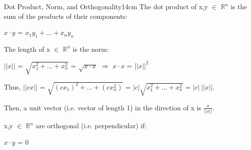     \begin{definition}{Dot Product, Norm, and Orthogonality}{14cm}
        The {\color{lblue} dot product} of x,y $\in$ $\mathbb{R}^n$
        is the sum of the products of their components:
        
        \hspace{0.5cm}
        $x \cdot y$ = $x_1y_1 + ... + x_ny_n$

        \vspace{0.3cm}

        The length of x $\in$ $\mathbb{R}^n$ is the {\color{lblue} norm}:
        
        \hspace{0.5cm}
        $||x||$ = $\sqrt{x_1^2 + ... + x_n^2}$
        = $\sqrt{x \cdot x}$
        \hspace{1cm}
        $\Rightarrow$
        \hspace{1cm}
        $x \cdot x$ = $||x||^2$

        Thus, $||cx||$
        = $\sqrt{(cx_1)^2 + ... + (cx_n^2)}$
        = $|c| \sqrt{x_1^2 + ... + x_n^2}$
        = $|c| \ ||x||$.

        Then, a {\color{lblue} unit vector} (i.e. vector of length 1)
        in the direction of x is $\frac{x}{||x||}$.

        \vspace{0.3cm}

        x,y $\in$ $\mathbb{R}^n$ are {\color{lblue} orthogonal}
        (i.e. perpendicular) if:

        \hspace{0.5cm}
        $x \cdot y$ = 0
    \end{definition}

    \newpage



